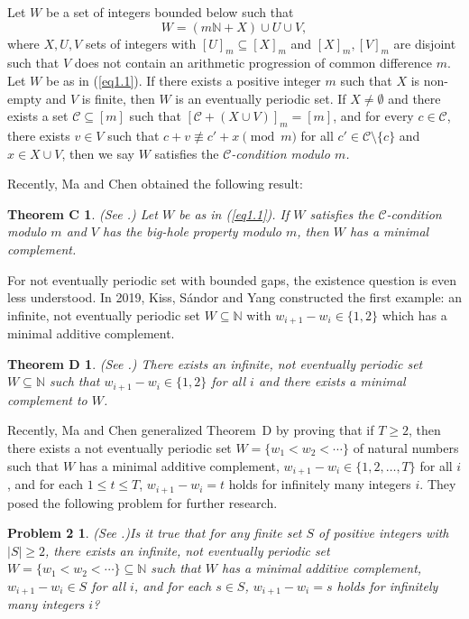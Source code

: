 \documentclass[12pt]{article}
\numberwithin{equation}{section}
\newtheorem*{problem2}{Problem 2}%
\newtheorem*{theoremC}{Theorem C}
\newtheorem*{theoremD}{Theorem D}
\begin{document}
Let $W$ be a set of integers bounded below such that
\begin{equation}\label{eq1.1}
W = (m\mathbb{N} + X) \cup U \cup V,
\end{equation} where $X, U, V$ sets of integers with $[U]_m \subseteq [X]_m$ and $[X]_m, [V]_m$ are disjoint such that $V$ does not contain an arithmetic progression of common difference $m$. Let $W$ be as in (\ref{eq1.1}). If there exists a positive integer $m$ such that $X$ is non-empty and $V$ is finite, then $W$ is an eventually periodic set.
 If $X\neq \emptyset$ and there exists a set $\mathcal{C} \subseteq [m]$ such that $[\mathcal{C} + (X \cup V)]_m = [m]$, and for every $c \in \mathcal{C}$, there exists $v \in V$ such that $c+v
\not\equiv c'+x \pmod m$ for all $c' \in \mathcal{C} \setminus \{c\}$ and $x \in X \cup V$, then we say $W$ satisfies the {\it $\mathcal{C}$-condition modulo $m$.}

Recently, Ma and Chen obtained the following result:

 \begin{theoremC} (See \cite[Theorem 1.1]{Ma26}.) Let $W$ be as in (\ref{eq1.1}). If $W$ satisfies the {\it $\mathcal{C}$-condition modulo $m$} and $V$
 has the {\it big-hole property modulo $m$}, then $W$ has a minimal complement.
 \end{theoremC}

 For not eventually periodic set with bounded gaps, the existence question is even less understood.
In 2019, Kiss, S\'{a}ndor and Yang \cite{KSY2019} constructed the first example: an infinite, not eventually periodic set $W\subseteq \mathbb{N}$ with $w_{i+1}-w_i\in\{1,2\}$ which has a minimal additive complement.
\begin{theoremD}(See \cite[Theorem 4]{KSY2019}.) There exists an infinite, not eventually periodic set $W\subseteq \mathbb{N}$ such that $w_{i+1}-w_i\in\{1,2\}$ for all $i$ and there exists a minimal complement to $W$.
\end{theoremD}

Recently, Ma and Chen \cite{Ma26} generalized Theorem~D by proving that if $T \geqslant 2$, then there exists a not eventually periodic set $W = \{w_1 < w_2 < \cdots\}$ of natural numbers such that $W$ has a minimal additive complement, $w_{i+1} - w_i \in \{1, 2, \ldots, T\}$ for all $i$, and for each $1 \leqslant t \leqslant T$, $w_{i+1} - w_i = t$ holds for infinitely many integers $i$. They posed the following problem for further research.

\begin{problem2}(See \cite[Problem 1.3]{Ma26}.)Is it true that for any finite set $S$ of positive integers with $|S|\geq 2 $, there exists an infinite, not eventually periodic set $W = \{ w_1 < w_2 < \cdots \} \subseteq \mathbb{N}$ such that $W$ has a minimal additive complement, $w_{i+1} - w_i \in S$ for all $i$, and for each $s \in S$, $w_{i+1} - w_i = s$ holds for infinitely many integers $i$?
\end{problem2}
\end{document}
